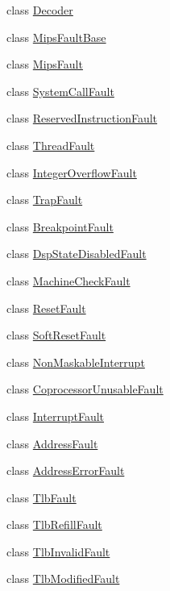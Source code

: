 \begin{DoxyCompactItemize}
\item 
class \hyperlink{classMipsISA_1_1Decoder}{Decoder}
\item 
class \hyperlink{classMipsISA_1_1MipsFaultBase}{MipsFaultBase}
\item 
class \hyperlink{classMipsISA_1_1MipsFault}{MipsFault}
\item 
class \hyperlink{classMipsISA_1_1SystemCallFault}{SystemCallFault}
\item 
class \hyperlink{classMipsISA_1_1ReservedInstructionFault}{ReservedInstructionFault}
\item 
class \hyperlink{classMipsISA_1_1ThreadFault}{ThreadFault}
\item 
class \hyperlink{classMipsISA_1_1IntegerOverflowFault}{IntegerOverflowFault}
\item 
class \hyperlink{classMipsISA_1_1TrapFault}{TrapFault}
\item 
class \hyperlink{classMipsISA_1_1BreakpointFault}{BreakpointFault}
\item 
class \hyperlink{classMipsISA_1_1DspStateDisabledFault}{DspStateDisabledFault}
\item 
class \hyperlink{classMipsISA_1_1MachineCheckFault}{MachineCheckFault}
\item 
class \hyperlink{classMipsISA_1_1ResetFault}{ResetFault}
\item 
class \hyperlink{classMipsISA_1_1SoftResetFault}{SoftResetFault}
\item 
class \hyperlink{classMipsISA_1_1NonMaskableInterrupt}{NonMaskableInterrupt}
\item 
class \hyperlink{classMipsISA_1_1CoprocessorUnusableFault}{CoprocessorUnusableFault}
\item 
class \hyperlink{classMipsISA_1_1InterruptFault}{InterruptFault}
\item 
class \hyperlink{classMipsISA_1_1AddressFault}{AddressFault}
\item 
class \hyperlink{classMipsISA_1_1AddressErrorFault}{AddressErrorFault}
\item 
class \hyperlink{classMipsISA_1_1TlbFault}{TlbFault}
\item 
class \hyperlink{classMipsISA_1_1TlbRefillFault}{TlbRefillFault}
\item 
class \hyperlink{classMipsISA_1_1TlbInvalidFault}{TlbInvalidFault}
\item 
class \hyperlink{classMipsISA_1_1TlbModifiedFault}{TlbModifiedFault}
\item 

\end{DoxyCompactItemize}
